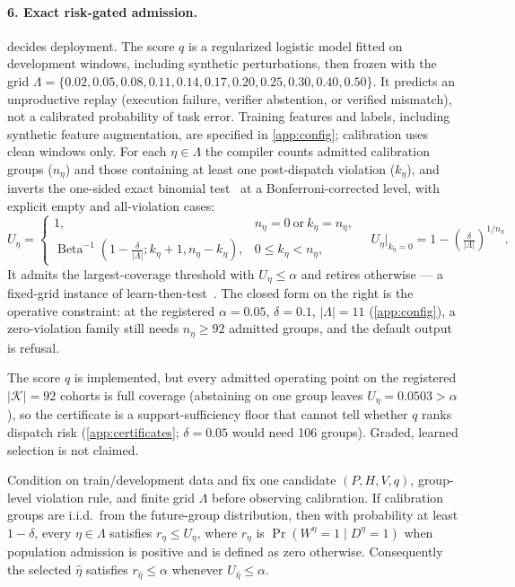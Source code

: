 \paragraph{6. Exact risk-gated admission.}
 decides deployment. The score $q$ is a regularized logistic model fitted on development
windows, including synthetic perturbations, then frozen with the grid
$\Lambda=\{0.02,0.05,0.08,0.11,0.14,0.17,0.20,0.25,0.30,0.40,0.50\}$.
It predicts an unproductive replay (execution failure, verifier abstention,
or verified mismatch), not a calibrated probability of task error. Training
features and labels, including synthetic feature augmentation, are specified
in \cref{app:config}; calibration uses clean windows only. For each
$\eta\in\Lambda$ the compiler counts admitted calibration groups ($n_\eta$) and
those containing at least one post-dispatch violation ($k_\eta$), and inverts
the one-sided exact binomial test~\citep{clopper1934binomial} at a
Bonferroni-corrected level, with explicit empty and all-violation cases:
\begin{equation}
  U_\eta=\begin{cases}
  1, & n_\eta=0\ \text{or}\ k_\eta=n_\eta,\\
  \operatorname{Beta}^{-1}\!\left(1-\tfrac{\delta}{|\Lambda|};
  k_\eta+1,n_\eta-k_\eta\right), & 0\le k_\eta<n_\eta,
  \end{cases}
  \quad U_\eta\big|_{k_\eta=0}=1-\left(\tfrac{\delta}{|\Lambda|}\right)^{1/n_\eta}.
  \label{eq:cp}
\end{equation}
It admits the largest-coverage threshold with $U_\eta\le\alpha$ and retires
otherwise --- a fixed-grid instance of learn-then-test~\citep{angelopoulos2022ltt}. The closed form on the right is the operative
constraint: at the registered $\alpha=0.05$, $\delta=0.1$, $|\Lambda|=11$
(\cref{app:config}), a zero-violation family still needs $n_\eta\ge 92$ admitted groups, and the default
output is refusal.

The score $q$ is implemented, but every admitted operating point on the
registered $|\mathcal{K}|=92$ cohorts is full coverage (abstaining on one group
leaves $U_\eta=0.0503>\alpha$), so the certificate is a support-sufficiency
floor that cannot tell whether $q$ ranks dispatch risk (\cref{app:certificates};
$\delta=0.05$ would need 106 groups). Graded, learned selection is not claimed.



\begin{proposition}
\label{prop:admission}
Condition on train/development data and fix one candidate $(P,H,V,q)$,
group-level violation rule, and finite grid $\Lambda$ before observing
calibration. If calibration groups are i.i.d.\ from the future-group
distribution, then with probability at least $1-\delta$, every
$\eta\in\Lambda$ satisfies $r_\eta\le U_\eta$, where
$r_\eta$ is $\Pr(W^\eta=1\mid D^\eta=1)$ when population admission is positive
and is defined as zero otherwise. Consequently the selected $\hat\eta$ satisfies
$r_{\hat\eta}\le\alpha$ whenever $U_{\hat\eta}\le\alpha$.
\end{proposition}

